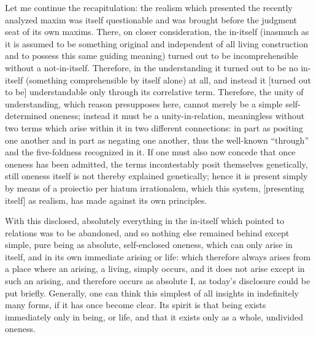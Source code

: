 Let me continue the recapitulation:
the realism which presented
the recently analyzed maxim was
itself questionable and was brought before
the judgment seat of its own maxims.
There, on closer consideration, the in-itself
(inasmuch as it is assumed to be something original
and independent of all living construction
and to possess this same guiding meaning)
turned out to be incomprehensible
without a not-in-itself.
Therefore, in the understanding
it turned out to be no in-itself
(something comprehensible by itself alone) at all,
and instead it [turned out to be] understandable
only through its correlative term.
Therefore, the unity of understanding,
which reason presupposes here,
cannot merely be a simple self-determined oneness;
instead it must be a unity-in-relation,
meaningless without two terms
which arise within it in two different connections:
in part as positing one another
and in part as negating one another,
thus the well-known “through” and
the five-foldness recognized in it.
If one must also now concede that
once oneness has been admitted,
the terms incontestably posit themselves genetically,
still oneness itself is not thereby explained genetically;
hence it is present simply by means of
a proiectio per hiatum irrationalem,
which this system, [presenting itself] as realism,
has made against its own principles.

With this disclosed, absolutely everything
in the in-itself which pointed to relations
was to be abandoned,
and so nothing else remained behind
except simple, pure being
as absolute, self-enclosed oneness,
which can only arise in itself,
and in its own immediate arising or life:
which therefore always arises
from a place where an arising,
a living, simply occurs, and
it does not arise except in such an arising,
and therefore occurs as absolute I,
as today’s disclosure could be put briefly.
Generally, one can think this simplest
of all insights in indefinitely many forms,
if it has once become clear.
Its spirit is that being exists
immediately only in being, or life,
and that it exists only
as a whole, undivided oneness.
